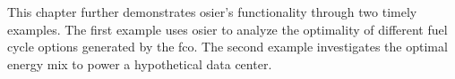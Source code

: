 This chapter further demonstrates \ac{osier}'s functionality through two timely examples. The first example uses \ac{osier} to 
analyze the optimality of different fuel cycle options generated by the \ac{fco}. The second example investigates the optimal
energy mix to power a hypothetical data center.



% 